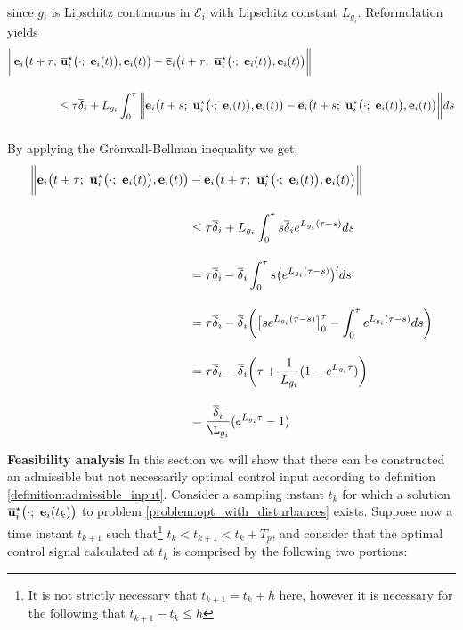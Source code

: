 \begin{gg_box}
\begin{align}
\end{align}
since $g_i$ is Lipschitz continuous in $\mathcal{E}_i$ with Lipschitz constant
$L_{g_i}$. Reformulation yields
\begin{align}
  \bigg\| \vect{e}_i\big(t+\tau;&\ \overline{\vect{u}}_i^{\star}\big(\cdot;\ \vect{e}_i(t)\big), \vect{e}_i(t)\big) -
  \overline{\vect{e}}_i\big(t+\tau;\ \overline{\vect{u}}_i^{\star}\big(\cdot;\ \vect{e}_i(t)\big), \vect{e}_i(t)\big) \bigg\| \\[2.5ex]
  &\leq \tau \overline{\delta}_i
  + L_{g_i} \int_{0}^{\tau} \bigg\| \vect{e}_i\big(t + s;\ \overline{\vect{u}}_i^{\star}\big(\cdot;\ \vect{e}_i(t)\big), \vect{e}_i(t)\big) -
  \overline{\vect{e}}_i\big(t + s;\ \overline{\vect{u}}_i^{\star}\big(\cdot;\ \vect{e}_i(t)\big), \vect{e}_i(t)\big) \bigg\| ds \\[2.5ex]
\end{align}
By applying the Gr\"{o}nwall-Bellman inequality we get:
\begin{align}
  \bigg\| \vect{e}_i\big(t + \tau;\ \overline{\vect{u}}_i^{\star}\big(\cdot;\ \vect{e}_i(t)\big), \vect{e}_i(t)\big) &-
    \overline{\vect{e}}_i\big(t + \tau;\ \overline{\vect{u}}_i^{\star}\big(\cdot;\ \vect{e}_i(t)\big), \vect{e}_i(t)\big) \bigg\| \\[2.5ex]
  &\leq \tau \overline{\delta}_i +  L_{g_i} \int_{0}^{\tau} s \overline{\delta}_i e^{L_{g_i}(\tau - s)} ds \\[2.5ex]
  &= \tau \overline{\delta}_i - \overline{\delta}_i \int_{0}^{\tau} s  \big(e^{L_{g_i}(\tau - s)}\big)' ds \\[2.5ex]
  &= \tau \overline{\delta}_i -
    \overline{\delta}_i \bigg( \big[s e^{L_{g_i}(\tau - s)}\big]_0^{\tau}
      - \int_{0}^{\tau} e^{L_{g_i}(\tau - s)}ds\bigg) \\[2.5ex]
  &= \tau \overline{\delta}_i - \overline{\delta}_i \bigg( \tau + \dfrac{1}{L_{g_i}} (1- e^{L_{g_i}\tau})\bigg) \\[2.5ex]
  &= \dfrac{\overline{\delta}_i}{\L_{g_i}} (e^{L_{g_i}\tau} - 1)
\end{align}
\qedsymbol
\end{gg_box}


\textbf{Feasibility analysis}
In this section we will show that there can be constructed an admissible
but not necessarily optimal control input according to definition
\eqref{definition:admissible_input}.
Consider a sampling instant $t_k$ for which a
solution $\overline{\vect{u}}_i^{\star}\big(\cdot;\ \vect{e}_i(t_k)\big)$ to
problem \eqref{problem:opt_with_disturbances} exists.
Suppose now a time instant $t_{k+1}$ such that\footnote{It is not strictly necessary
that $t_{k+1} = t_k + h$ here, however it is necessary for the following that
$t_{k+1} - t_k \leq h$} $t_k < t_{k+1} < t_k + T_p$, and consider that the
optimal control signal calculated at $t_k$ is comprised by the following two
portions:

